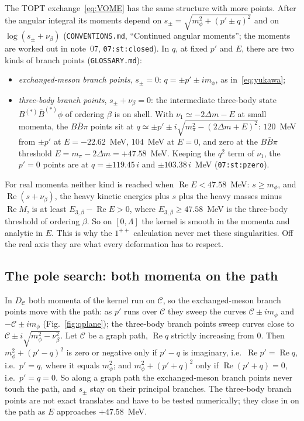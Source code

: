 \documentclass[11pt]{article}
\newcommand{\file}[1]{\nolinkurl{#1}}
\begin{document}
The TOPT exchange~\eqref{eq:VOME} has the same structure with more points. After the angular integral its moments depend on $s_\pm=\sqrt{m_\phi^2+(p'\pm q)^2}$ and on $\log(s_\pm+\nu_\beta)$ (\file{CONVENTIONS.md}, ``Continued angular moments''; the moments are worked out in note~07, \texttt{07:st:closed}). In $q$, at fixed $p'$ and $E$, there are two kinds of branch points (\file{GLOSSARY.md}):
\begin{itemize}
\item \emph{exchanged-meson branch points}, $s_\pm=0$: $q=\pm p'\pm im_\phi$, as in~\eqref{eq:yukawa};
\item \emph{three-body branch points}, $s_\pm+\nu_\beta=0$: the intermediate three-body state $B^{(*)}\bar B^{(*)}\phi$ of ordering $\beta$ is on shell. With $\nu_1\simeq-2\Delta m-E$ at small momenta, the $B\bar B\pi$ points sit at $q\simeq\pm p'\pm i\sqrt{m_\pi^2-(2\Delta m+E)^2}$: $120$~MeV from $\pm p'$ at $E=-22.62$~MeV, $104$~MeV at $E=0$, and zero at the $B\bar B\pi$ threshold $E=m_\pi-2\Delta m=+47.58$~MeV. Keeping the $q^2$ term of $\nu_1$, the $p'=0$ points are at $q=\pm119.45\,i$ and $\pm103.38\,i$~MeV (\texttt{07:st:pzero}).
\end{itemize}
For real momenta neither kind is reached when $\operatorname{Re}E<47.58$~MeV: $s\ge m_\phi$, and $\operatorname{Re}(s+\nu_\beta)$, the heavy kinetic energies plus $s$ plus the heavy masses minus $\operatorname{Re}M$, is at least $E_{3,\beta}-\operatorname{Re}E>0$, where $E_{3,\beta}\ge47.58$~MeV is the three-body threshold of ordering $\beta$. So on $[0,\Lambda]$ the kernel is smooth in the momenta and analytic in $E$. This is why the $1^{++}$ calculation never met these singularities. Off the real axis they are what every deformation has to respect.

\subsection{The pole search: both momenta on the path}\label{sec:both}

In $D_{\mathcal C}$ both momenta of the kernel run on $\mathcal C$, so the exchanged-meson branch points move with the path: as $p'$ runs over $\mathcal C$ they sweep the curves $\mathcal C\pm im_\phi$ and $-\mathcal C\pm im_\phi$ (Fig.~\ref{fig:qplane}); the three-body branch points sweep curves close to $\mathcal C\pm i\sqrt{m_\phi^2-\nu_\beta^2}$. Let $\mathcal C$ be a graph path, $\operatorname{Re}q$ strictly increasing from $0$. Then $m_\phi^2+(p'-q)^2$ is zero or negative only if $p'-q$ is imaginary, i.e.\ $\operatorname{Re}p'=\operatorname{Re}q$, i.e.\ $p'=q$, where it equals $m_\phi^2$; and $m_\phi^2+(p'+q)^2$ only if $\operatorname{Re}(p'+q)=0$, i.e.\ $p'=q=0$. So along a graph path the exchanged-meson branch points never touch the path, and $s_\pm$ stay on their principal branches. The three-body branch points are not exact translates and have to be tested numerically; they close in on the path as $E$ approaches $+47.58$~MeV.
\end{document}
